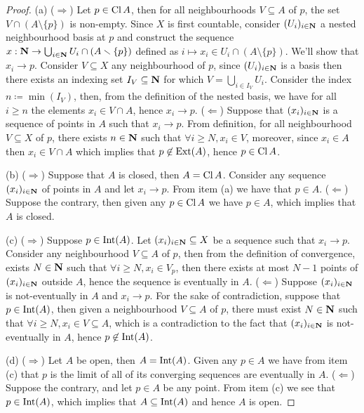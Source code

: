 \begin{proof}
    (a) (\(\Rightarrow\)) Let \(p \in \operatorname{Cl} A\), then for all neighbourhoods
    \(V \subseteq A\) of \(p\), the set \(V \cap (A \setminus \{p\})\) is
    non-empty. Since \(X\) is first countable, consider \((U_i)_{i \in \mathbf{N}}\) a nested
    neighbourhood basis at \(p\) and construct the sequence \(x : \mathbf{N} \to \bigcup_{i
        \in \mathbf{N}} U_i \cap (A \smallsetminus \{p\}) \) defined as \(i \mapsto x_i \in U_i \cap
    (A \setminus \{p\})\). We'll show that \(x_i \to p\). Consider \(V \subseteq X\)
    any neighbourhood of \(p\), since \((U_i)_{i \in \mathbf{N}}\) is a basis then there
    exists an indexing set \(I_{V} \subseteq \mathbf{N}\) for which \(V = \bigcup_{i \in
        I_V} U_i\).  Consider the index \(n \coloneq \min(I_V)\), then, from the
    definition of the nested basis, we have for all \(i \geq n\) the elements \(x_i
    \in V \cap A\), hence \(x_i \to p\).
    (\(\Leftarrow\)) Suppose that \((x_i)_{i \in \mathbf{N}}\) is a sequence of points in
    \(A\) such that \(x_i \to p\). From definition, for all neighbourhood \(V
    \subseteq X\) of \(p\), there exists \(n \in \mathbf{N}\) such that \(\forall i \geq N,
    x_i \in V\), moreover, since \(x_i \in A\) then \(x_i \in V \cap A\) which
    implies that \(p \not\in \operatorname{Ext}(A)\), hence \(p \in \operatorname{Cl} A\).

    (b) (\(\Rightarrow\)) Suppose that \(A\) is closed, then \(A = \operatorname{Cl} A\).
    Consider any sequence \((x_i)_{i \in \mathbf{N}}\) of points in \(A\) and let
    \(x_i \to p\). From item (a) we have that \(p \in A\). (\(\Leftarrow\))
    Suppose the contrary, then given any \(p \in \operatorname{Cl} A\) we have \(p \in
    A\), which implies that \(A\) is closed.

    (c) (\(\Rightarrow\)) Suppose \(p \in \operatorname{Int}(A)\). Let \((x_i)_{i \in
            \mathbf{N}} \subseteq X\) be a sequence such that \(x_i \to p\). Consider any
    neighbourhood \(V \subseteq A\) of \(p\), then from the definition of
    convergence, exists \(N \in \mathbf{N}\) such that \(\forall i \geq N, x_i \in
    V_p\), then there exists at most \(N - 1\) points of \((x_i)_{i \in
            \mathbf{N}}\) outside \(A\), hence the sequence is eventually in \(A\).
    (\(\Leftarrow\)) Suppose \((x_i)_{i \in \mathbf{N}}\) is not-eventually in
    \(A\) and \(x_i \to p\). For the sake of contradiction, suppose that \(p \in
    \operatorname{Int}(A)\), then given a neighbourhood \(V \subseteq A\) of \(p\), there must
    exist \(N \in \mathbf{N}\) such that \(\forall i \geq N, x_i \in V \subseteq
    A\), which is a contradiction to the fact that \((x_i)_{i \in \mathbf{N}}\) is
    not-eventually in \(A\), hence \(p \not\in \operatorname{Int}(A)\).

    (d) (\(\Rightarrow\)) Let \(A\) be open, then \(A = \operatorname{Int}(A)\). Given any \(p
    \in A\) we have from item (c) that \(p\) is the limit of all of its converging
    sequences are eventually in \(A\). (\(\Leftarrow\)) Suppose the contrary, and
    let \(p \in A\) be any point. From item (c) we see that \(p \in \operatorname{Int}(A)\),
    which implies that \(A \subseteq \operatorname{Int}(A)\) and hence \(A\) is open.
\end{proof}

